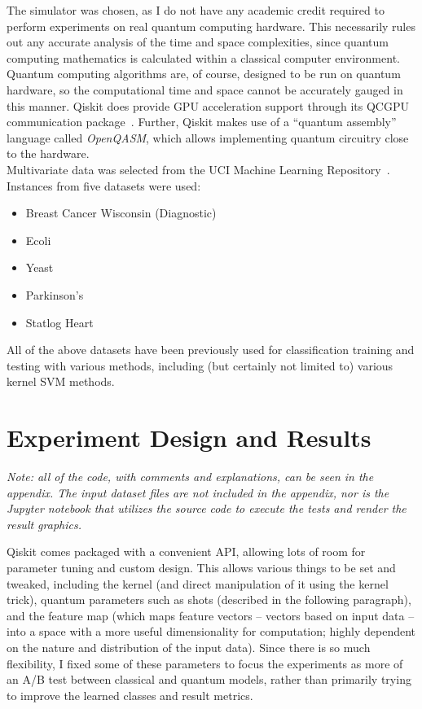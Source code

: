 \documentclass{article}
\begin{document}
  The simulator was chosen, as I do not have any academic credit required to perform experiments on real quantum computing hardware. This necessarily rules out any accurate analysis of the time and space complexities, since quantum computing mathematics is calculated within a classical computer environment. Quantum computing algorithms are, of course, designed to be run on quantum hardware, so the computational time and space cannot be accurately gauged in this manner. Qiskit does provide GPU acceleration support through its QCGPU communication package~\cite{qcgpu}. Further, Qiskit makes use of a ``quantum assembly'' language called \textit{OpenQASM}, which allows implementing quantum circuitry close to the hardware. \\

  Multivariate data was selected from the UCI Machine Learning Repository~\cite{uci}. Instances from five datasets were used:

    \begin{itemize}
      \item Breast Cancer Wisconsin (Diagnostic)~\cite{bc}
      \item Ecoli~\cite{ecoli}
      \item Yeast~\cite{yeast}
      \item Parkinson's~\cite{park}
      \item Statlog Heart~\cite{heart}
    \end{itemize}

  All of the above datasets have been previously used for classification training and testing with various methods, including (but certainly not limited to) various kernel SVM methods.

\section*{Experiment Design and Results}
  \begin{center}
    \textit{Note: all of the code, with comments and explanations, can be seen in the appendix. The input dataset files are not included in the appendix, nor is the Jupyter notebook that utilizes the source code to execute the tests and render the result graphics.}
  \end{center}

  Qiskit comes packaged with a convenient API, allowing lots of room for parameter tuning and custom design. This allows various things to be set and tweaked, including the kernel (and direct manipulation of it using the kernel trick), quantum parameters such as shots (described in the following paragraph), and the feature map (which maps feature vectors -- vectors based on input data -- into a space with a more useful dimensionality for computation; highly dependent on the nature and distribution of the input data). Since there is so much flexibility, I fixed some of these parameters to focus the experiments as more of an A/B test between classical and quantum models, rather than primarily trying to improve the learned classes and result metrics. \\
\end{document}
